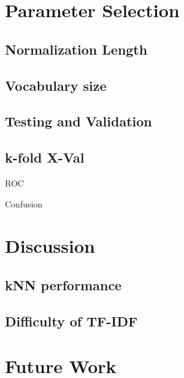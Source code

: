 \documentclass[10pt,twocolumn]{article}
\begin{document}
\section*{Parameter Selection}

\subsection*{Normalization Length}

\subsection*{Vocabulary size}

\subsection*{Testing and Validation}

\subsection*{k-fold X-Val}

ROC

Confusion
 
\section*{Discussion}

\subsection*{kNN performance}

\subsection*{Difficulty of TF-IDF}

\section*{Future Work}
\end{document}
